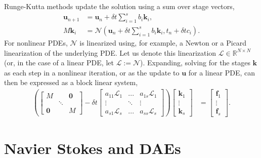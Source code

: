 \documentclass[a4paper,10pt]{article}
\begin{document}
Runge-Kutta methods update the solution using a sum over stage vectors,
%
\begin{align*}
\mathbf{u}_{n+1} & = \mathbf{u}_n + \delta t \sum_{i=1}^s b_i\mathbf{k}_i, \\
M\mathbf{k}_i & = \mathcal{N}\left(\mathbf{u}_n + \delta t\sum_{i=1}^s b_i\mathbf{k}_i, t_n+\delta tc_i\right).
\end{align*}
%
For nonlinear PDEs, $\mathcal{N}$ is linearized using, for example, a Newton or a Picard
linearization of the underlying PDE. Let us denote this linearization $\mathcal{L}\in\mathbb{R}^{N\times N}$
(or, in the case of a linear PDE, let $\mathcal{L} := \mathcal{N}$).
Expanding, solving for the stages $\mathbf{k}$ as each step in a nonlinear iteration, or
as the update to $\mathbf{u}$ for a linear PDE, can then be expressed as a block linear system,
%
\begin{align}\label{eq:k0}
\left( \begin{bmatrix} M  & & \mathbf{0} \\ & \ddots \\ \mathbf{0} & & M\end{bmatrix}
	- \delta t \begin{bmatrix} a_{11}\mathcal{L}_1 & ... & a_{1s}\mathcal{L}_1 \\
	\vdots & \ddots & \vdots \\ a_{s1}\mathcal{L}_s & ... & a_{ss} \mathcal{L}_s \end{bmatrix} \right)
	\begin{bmatrix} \mathbf{k}_1 \\ \vdots \\ \mathbf{k}_s \end{bmatrix} 
& = \begin{bmatrix} \mathbf{f}_1 \\ \vdots \\ \mathbf{f}_s \end{bmatrix}.
\end{align}
%

\section{Navier Stokes and DAEs}
\end{document}
